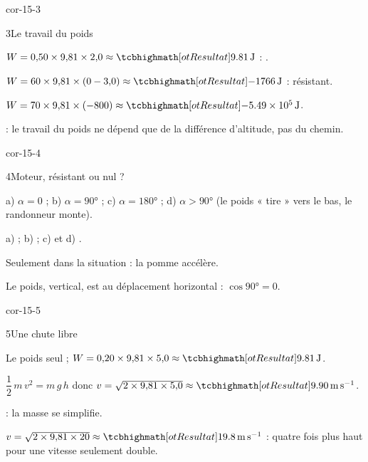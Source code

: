 \begin{blocLivre}{cor-15-3}
\begin{corrige}{3}{Le travail du poids}
\begin{questions}
\item $W=0{,}50\times9{,}81\times2{,}0\approx\res{\qty{9,81}{J}}$ : .
\item $W=60\times9{,}81\times(0-3{,}0)\approx\res{\qty{-1766}{J}}$ : résistant.
\item $W=70\times9{,}81\times(-800)\approx\res{\qty{-5,49e5}{J}}$.
\item {} : le travail du poids ne dépend que de la différence d'altitude, pas du chemin.
\end{questions}
\end{corrige}
\end{blocLivre}
\begin{blocLivre}{cor-15-4}
\begin{corrige}{4}{Moteur, résistant ou nul ?}
\begin{questions}
\item a) $\alpha=0$ ; b) $\alpha=\ang{90}$ ; c) $\alpha=\ang{180}$ ; d) $\alpha>\ang{90}$ (le poids « tire » vers le bas, le randonneur monte).
\item a)  ; b)  ; c) et d) .
\item Seulement dans la situation  : la pomme accélère.
\item Le poids, vertical, est  au déplacement horizontal : $\cos\ang{90}=0$.
\end{questions}
\end{corrige}
\end{blocLivre}
\begin{blocLivre}{cor-15-5}
\begin{corrige}{5}{Une chute libre}
\begin{questions}
\item Le poids seul ; $W=0{,}20\times9{,}81\times5{,}0\approx\res{\qty{9,81}{J}}$.
\item $\dfrac{1}{2}\,m\,v^2=m\,g\,h$ donc $v=\sqrt{2\times9{,}81\times5{,}0}\approx\res{\qty{9,90}{m.s^{-1}}}$.
\item {} : la masse se simplifie.
\item $v=\sqrt{2\times9{,}81\times20}\approx\res{\qty{19,8}{m.s^{-1}}}$ : quatre fois plus haut pour une vitesse seulement double.
\end{questions}
\end{corrige}
\end{blocLivre}
